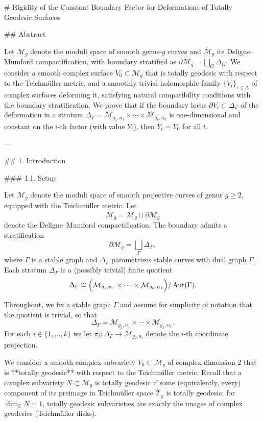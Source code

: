 # Rigidity of the Constant Boundary Factor for Deformations of Totally Geodesic Surfaces

## Abstract

Let $\mathcal{M}_g$ denote the moduli space of smooth genus-$g$ curves and $\overline{\mathcal{M}}_g$ its Deligne–Mumford compactification, with boundary stratified as $\partial \mathcal{M}_g = \bigsqcup_G \Delta_G$. We consider a smooth complex surface $V_0 \subset \mathcal{M}_g$ that is totally geodesic with respect to the Teichmüller metric, and a smoothly trivial holomorphic family $\{V_t\}_{t \in \Delta}$ of complex surfaces deforming it, satisfying natural compatibility conditions with the boundary stratification. We prove that if the boundary locus $\partial V_t \subset \Delta_\Gamma$ of the deformation in a stratum $\Delta_\Gamma = \mathcal{M}_{g_1,n_1} \times \cdots \times \mathcal{M}_{g_k,n_k}$ is one-dimensional and constant on the $i$-th factor (with value $Y_t$), then $Y_t = Y_0$ for all $t$.

---

## 1. Introduction

### 1.1. Setup

Let $\mathcal{M}_g$ denote the moduli space of smooth projective curves of genus $g \geq 2$, equipped with the Teichmüller metric. Let
$$\overline{\mathcal{M}}_g = \mathcal{M}_g \sqcup \partial \mathcal{M}_g$$
denote the Deligne–Mumford compactification. The boundary admits a stratification
$$\partial \mathcal{M}_g = \bigsqcup_{\Gamma} \Delta_\Gamma,$$
where $\Gamma$ is a stable graph and $\Delta_\Gamma$ parametrizes stable curves with dual graph $\Gamma$. Each stratum $\Delta_\Gamma$ is a (possibly trivial) finite quotient
$$\Delta_\Gamma \cong \Bigl(\mathcal{M}_{g_1, n_1} \times \cdots \times \mathcal{M}_{g_k, n_k}\Bigr) / \operatorname{Aut}(\Gamma).$$

Throughout, we fix a stable graph $\Gamma$ and assume for simplicity of notation that the quotient is trivial, so that
$$\Delta_\Gamma = \mathcal{M}_{g_1,n_1} \times \cdots \times \mathcal{M}_{g_k,n_k}.$$
For each $i \in \{1, \ldots, k\}$ we let $\pi_i : \Delta_\Gamma \to \mathcal{M}_{g_i, n_i}$ denote the $i$-th coordinate projection.

We consider a smooth complex subvariety $V_0 \subset \mathcal{M}_g$ of complex dimension $2$ that is **totally geodesic** with respect to the Teichmüller metric. Recall that a complex subvariety $N \subset \mathcal{M}_g$ is totally geodesic if some (equivalently, every) component of its preimage in Teichmüller space $\mathcal{T}_g$ is totally geodesic; for $\dim_{\mathbb{C}} N = 1$, totally geodesic subvarieties are exactly the images of complex geodesics (Teichmüller disks).

